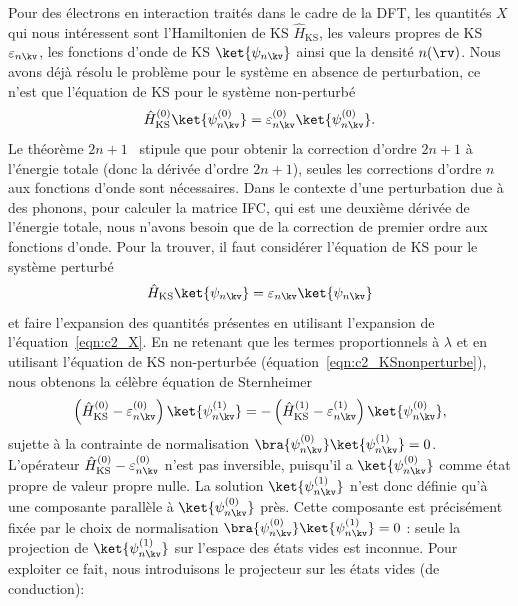 Pour des électrons en interaction traités dans le cadre de la DFT, les quantités $X$ qui nous intéressent sont l'Hamiltonien de KS $\hat{H}_\text{KS}$, les valeurs propres de KS $\varepsilon_{n\kv}$, les fonctions d'onde de KS $\ket{\psi_{n\kv}}$ ainsi que la densité $n(\rv)$. Nous avons déjà résolu le problème pour le système en absence de perturbation, ce n'est que l'équation de KS pour le système non-perturbé
\begin{equation}
    \hat{H}_\text{KS}^{(0)}\ket{\psi_{n\kv}^{(0)}}=\varepsilon_{n\kv}^{(0)}\ket{\psi_{n\kv}^{(0)}}.
    \label{eqn:c2_KSnonperturbe}
\end{equation}
Le théorème $2n+1$~\cite{dalgarnoPerturbationCalculationProperties1958,gonzeDensityfunctionalApproachNonlinearresponse1989,gonzeAdiabaticDensityfunctionalPerturbation1995,baroniPhononsRelatedCrystal2001a} stipule que pour obtenir la correction d'ordre $2n+1$ à l'énergie totale (donc la dérivée d'ordre $2n+1$), seules les corrections d'ordre $n$ aux fonctions d'onde sont nécessaires. 
Dans le contexte d'une perturbation due à des phonons, pour calculer la matrice IFC, qui est une deuxième dérivée de l'énergie totale, nous n'avons besoin que de la correction de premier ordre aux fonctions d'onde. Pour la trouver, il faut considérer l'équation de KS pour le système perturbé
\begin{equation}
    \hat{H}_\text{KS}\ket{\psi_{n\kv}}=\varepsilon_{n\kv}\ket{\psi_{n\kv}}
\end{equation}
et faire l'expansion des quantités présentes en utilisant l'expansion de l'équation~\eqref{eqn:c2_X}. En ne retenant que les termes proportionnels à $\lambda$ et en utilisant l'équation de KS non-perturbée (équation~\eqref{eqn:c2_KSnonperturbe}), nous obtenons la célèbre équation de Sternheimer~\cite{gonzeAdiabaticDensityfunctionalPerturbation1995}
\begin{equation}
    \left(\hat{H}^{(0)}_\text{KS}-\varepsilon_{n\kv}^{(0)}\right)\ket{\psi_{n\kv}^{(1)}}=-\left(\hat{H}^{(1)}_\text{KS}-\varepsilon^{(1)}_{n\kv}\right)\ket{\psi^{(0)}_{n\kv}},
    \label{eqn:c2_sternheimer}
\end{equation}
sujette à la contrainte de normalisation $\bra{\psi_{n\kv}^{(0)}}\ket{\psi_{n\kv}^{(1)}}=0$. L'opérateur $\hat{H}^{(0)}_\text{KS}-\varepsilon_{n\kv}^{(0)}$ n'est pas inversible, puisqu'il a $\ket{\psi_{n\kv}^{(0)}}$ comme état propre de valeur propre nulle. La solution $\ket{\psi_{n\kv}^{(1)}}$ n'est donc définie qu'à une composante parallèle à $\ket{\psi_{n\kv}^{(0)}}$ près. Cette composante est précisément fixée par le choix de normalisation $\bra{\psi_{n\kv}^{(0)}}\ket{\psi_{n\kv}^{(1)}}=0$ : seule la projection de $\ket{\psi_{n\kv}^{(1)}}$ sur l'espace des états vides est inconnue. Pour exploiter ce fait, nous introduisons le projecteur sur les états vides (de conduction):

